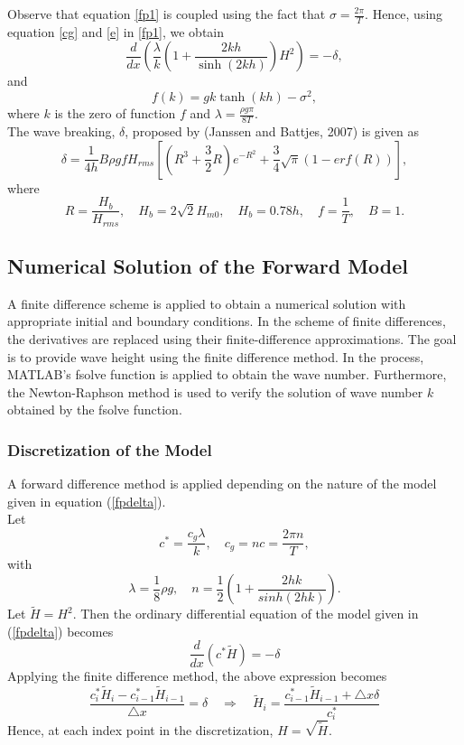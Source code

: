 \noindent Observe that equation \ref{fp1} is coupled using the fact that $\sigma=\frac{2\pi}{T}$. Hence, using equation \ref{cg} and \ref{e} in \ref{fp1}, we obtain
\begin{equation}
\label{fpdelta}
\frac{d}{dx}\left( \frac{\lambda}{k}\left(1+\frac{2kh}{\sinh(2kh)}\right)H^2 \right)=-\delta,
\end{equation}  
and 
\begin{equation}
\label{fk}
f(k) = gk\tanh(kh)-\sigma^2,
\end{equation}
where $k$ is the zero of function $f$ and $\lambda=\frac{\rho g \pi}{8T}$.\\

The wave breaking, $\delta$, proposed by (Janssen and Battjes, 2007) is given as
\begin{equation}
\delta = \frac{1}{4h}B\rho g f H_{rms}\left[(R^3+\frac{3}{2}R)e^{-R^2}+\frac{3}{4}\sqrt{\pi}(1-erf(R))\right],
\end{equation}
where $$R=\frac{H_b}{H_{rms}}, \quad H_b = 2\sqrt{2}H_{m0},\quad H_b=0.78h,\quad f=\frac{1}{T},\quad B=1.$$
\subsection{Numerical Solution of the Forward Model}
A finite difference scheme is applied to obtain a numerical solution with appropriate initial and boundary conditions. In the scheme of finite differences, the derivatives are replaced using their finite-difference approximations. The goal is to provide wave height using the finite difference method. In the process, MATLAB's fsolve function is applied to obtain the wave number. Furthermore, the Newton-Raphson method is used to verify the solution of wave number $k$ obtained by the fsolve function.
\subsubsection{Discretization of the Model}
A forward difference method is applied depending on the nature of the model given in equation (\ref{fpdelta}).\\
Let 
$$c^{*} = \frac{c_{g}\lambda}{k},\quad c_{g} = nc =\frac{2\pi n}{T},$$
with 
$$\lambda = \frac{1}{8}\rho g, \quad n = \frac{1}{2}\left(1+\frac{2hk}{sinh(2hk)}\right).$$
Let $\widetilde{H}=H^{2}$. Then the ordinary differential equation of the model given in (\ref{fpdelta}) becomes
\begin{equation}
\frac{d}{dx}\left( c^{*}\widetilde{H}\right)=-\delta
\end{equation}
Applying the finite difference method, the above expression becomes
$$
\frac{c_{i}^{*}\widetilde{H}_{i}-c_{i-1}^{*}\tilde{H}_{i-1}}{\triangle x}= \delta \quad \Rightarrow \quad
\widetilde{H}_{i}=\frac{c_{i-1}^{*}\widetilde{H}_{i-1}+\triangle x \delta}{c_{i}^{*}}
$$
Hence, at each index point in the discretization, $
H=\sqrt{\widetilde{H}}$.

